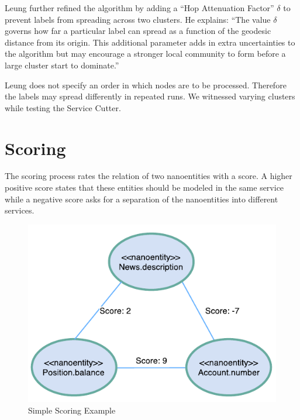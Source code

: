 Leung further refined the algorithm by adding a \enquote{Hop Attenuation Factor} $\delta$ to prevent labels from spreading across two clusters. He explains: \enquote{The value $\delta$ governs how far a particular label can spread as a function of the geodesic distance from its origin. This additional parameter adds in extra uncertainties
to the algorithm but may encourage a stronger local community to form before a large cluster start to dominate.}

Leung does not specify an order in which nodes are to be processed. Therefore the labels may spread differently in repeated runs. We witnessed varying clusters while testing the Service Cutter. %

\section{Scoring}

The scoring process rates the relation of two nanoentities with a score. A higher positive score states that these entities should be modeled in the same service while a negative score asks for a separation of the nanoentities into different services.

\begin{figure}[H]
	\begin{center}
		\includegraphics[scale=1]{diagrams/scoring_example.pdf}
		\caption{Simple Scoring Example}
		\label{fig:scoringExample}
	\end{center}
\end{figure}

